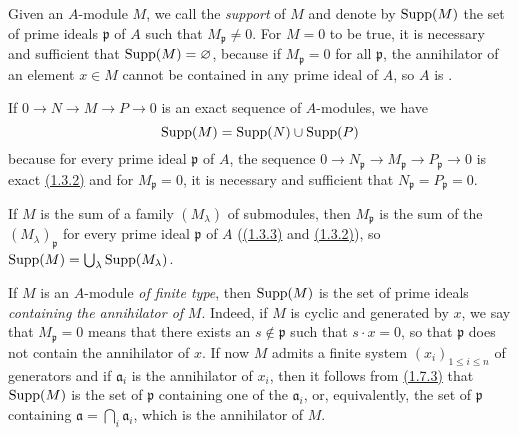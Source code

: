 \begin{env}[1.7.1]
\label{0.1.7.1}
Given an $A$-module $M$, we call the {\em support} of $M$ and denote by
${\mathop{\mathrm{Supp}}\nolimits}(M)$ the set of prime ideals $\mathfrak{p}$ of $A$ such that
$M_\mathfrak{p}\neq 0$. For $M=0$ to be true, it is necessary and sufficient
that ${\mathop{\mathrm{Supp}}\nolimits}(M)=\varnothing$, because if $M_\mathfrak{p}=0$ for all $\mathfrak{p}$, the
annihilator of an element $x\in M$ cannot be contained in any prime ideal of
$A$, so $A$ is .
\end{env}

\begin{env}[1.7.2]
\label{0.1.7.2}
If $0\to N\to M\to P\to 0$ is an exact sequence of $A$-modules, we have
\[
  {\mathop{\mathrm{Supp}}\nolimits}(M)={\mathop{\mathrm{Supp}}\nolimits}(N)\cup{\mathop{\mathrm{Supp}}\nolimits}(P)
\]
because for every prime ideal $\mathfrak{p}$ of $A$, the sequence
$0\to N_\mathfrak{p}\to M_\mathfrak{p}\to P_\mathfrak{p}\to 0$ is exact
\hyperref[0.1.3.2]{(1.3.2)} and for $M_\mathfrak{p}=0$, it is necessary and sufficient
that $N_\mathfrak{p}=P_\mathfrak{p}=0$.
\end{env}

\begin{env}[1.7.3]
\label{0.1.7.3}
If $M$ is the sum of a family $(M_\lambda)$ of submodules, then $M_\mathfrak{p}$
is the sum of the $(M_\lambda)_\mathfrak{p}$ for every prime ideal
$\mathfrak{p}$ of $A$ (\hyperref[0.1.3.3]{(1.3.3)} and \hyperref[0.1.3.2]{(1.3.2)}),
so ${\mathop{\mathrm{Supp}}\nolimits}(M)=\bigcup_\lambda{\mathop{\mathrm{Supp}}\nolimits}(M_\lambda)$.
\end{env}

\begin{env}[1.7.4]
\label{0.1.7.4}
If $M$ is an $A$-module {\em of finite type}, then ${\mathop{\mathrm{Supp}}\nolimits}(M)$ is the set of prime
ideals {\em containing the annihilator of} $M$. Indeed, if $M$ is cyclic and
generated by $x$, we say that $M_\mathfrak{p}=0$ means that there exists an
$s\not\in\mathfrak{p}$ such that $s\cdot x=0$, so that $\mathfrak{p}$ does not
contain the annihilator of $x$. If now $M$ admits a finite system
$(x_i)_{1\leqslant i\leqslant n}$ of generators and if $\mathfrak{a}_i$ is the
annihilator of $x_i$, then it follows from \hyperref[0.1.7.3]{(1.7.3)} that ${\mathop{\mathrm{Supp}}\nolimits}(M)$ is
the set of $\mathfrak{p}$ containing one of the $\mathfrak{a}_i$, or,
equivalently, the set of $\mathfrak{p}$ containing
$\mathfrak{a}=\bigcap_i\mathfrak{a}_i$, which is the annihilator of $M$.
\end{env}

